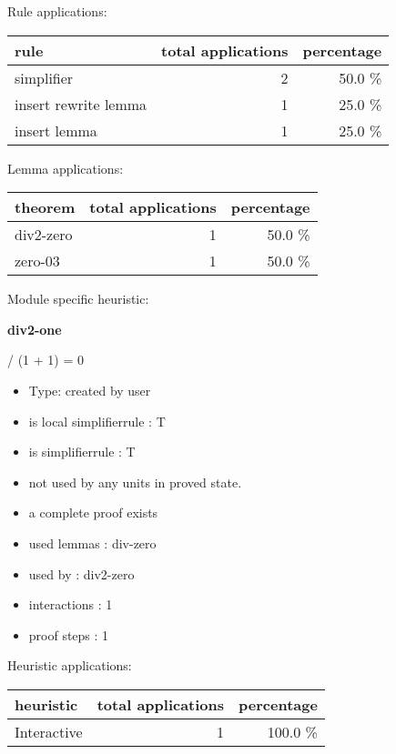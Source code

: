 \documentclass[a4paper]{article}
\begin{document}
Rule applications:

\begin{supertabular}{l|r|r}
rule	        & total applications & percentage \\ \hline
simplifier & 2 & 50.0 \% \\
insert rewrite lemma & 1 & 25.0 \% \\
insert lemma & 1 & 25.0 \% \\

\end{supertabular}

Lemma applications:

\begin{supertabular}{l|r|r}
theorem	        & total applications & percentage \\ \hline
div2-zero & 1 & 50.0 \% \\
zero-03 & 1 & 50.0 \% \\

\end{supertabular}

Module specific heuristic:

\pagebreak

{\LARGE\bf div2-one}\label{lemma-div2-one}

\medskip

  / (1 + 1) = 0

\begin{itemize}

\item Type: created by user

\item is local simplifierrule : T
\item is simplifierrule : T
\item not used by any units in proved state.
\item       a complete proof exists
\item       used lemmas  : div-zero
\item       used by      : div2-zero
\item       interactions : 1
\item       proof steps  : 1
\end{itemize}

\medskip


Heuristic applications:

\begin{supertabular}{l|r|r}
heuristic	& total applications & percentage \\ \hline
Interactive & 1 & 100.0 \% \\

\end{supertabular}
\end{document}
